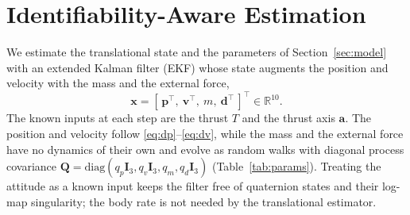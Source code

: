 \documentclass{ieeeaccess}
\newcommand{\R}{\mathbb{R}}
\newcommand{\vect}[1]{\bm{#1}}
\newcommand{\mat}[1]{\mathbf{#1}}
\def\DIFaddbegin{\color{blue}}\def\DIFaddend{\color{black}}\def\DIFdelbegin{}\def\DIFdelend{} %
\begin{document}
\DIFdelbegin %
\DIFdelend \DIFaddbegin \section{Identifiability-Aware Estimation}\DIFaddend \label{sec:mhe}

We estimate the translational state and the parameters of
Section~\ref{sec:model} with an extended Kalman filter (EKF) whose state augments
the position and velocity with the mass and the external force,
\begin{equation}
\vect{x}=[\,\vect{p}^{\!\top},\ \vect{v}^{\!\top},\ m,\ \vect{d}^{\!\top}\,]^{\!\top}\in\R^{10}.
\label{eq:state}
\end{equation}
The known inputs at each step are the thrust $T$ and the thrust axis $\vect{a}$.
The position and velocity follow \eqref{eq:dp}--\eqref{eq:dv}, while the mass and
the external force have no dynamics of their own and evolve as random walks with
diagonal process covariance $\mat{Q}=\mathrm{diag}(q_p\mat{I}_3,q_v\mat{I}_3,q_m,q_d\mat{I}_3)$
(Table~\ref{tab:params}). Treating the
attitude as a known input keeps the filter free of quaternion states and their
log-map singularity; the body rate is not needed by the translational estimator.
\end{document}
